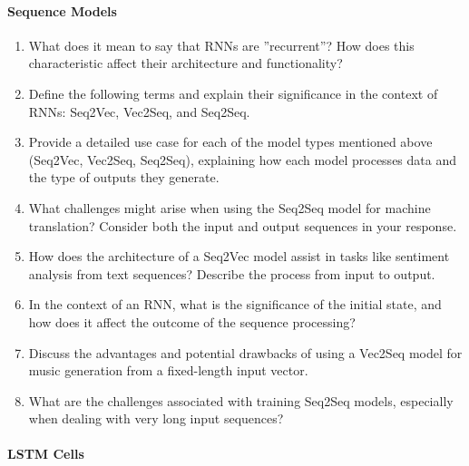 \paragraph*{Sequence Models}

\begin{enumerate}
	\item What does it mean to say that RNNs are ''recurrent''? How does this characteristic affect their architecture and functionality?
	\item Define the following terms and explain their significance in the context of RNNs: Seq2Vec, Vec2Seq, and Seq2Seq.
	\item Provide a detailed use case for each of the model types mentioned above (Seq2Vec, Vec2Seq, Seq2Seq), explaining how each model processes data and the type of outputs they generate.
	\item What challenges might arise when using the Seq2Seq model for machine translation? Consider both the input and output sequences in your response.
	\item How does the architecture of a Seq2Vec model assist in tasks like sentiment analysis from text sequences? Describe the process from input to output.
	\item In the context of an RNN, what is the significance of the initial state, and how does it affect the outcome of the sequence processing?
	\item Discuss the advantages and potential drawbacks of using a Vec2Seq model for music generation from a fixed-length input vector.
	\item What are the challenges associated with training Seq2Seq models, especially when dealing with very long input sequences?
\end{enumerate}

\paragraph*{LSTM Cells}

